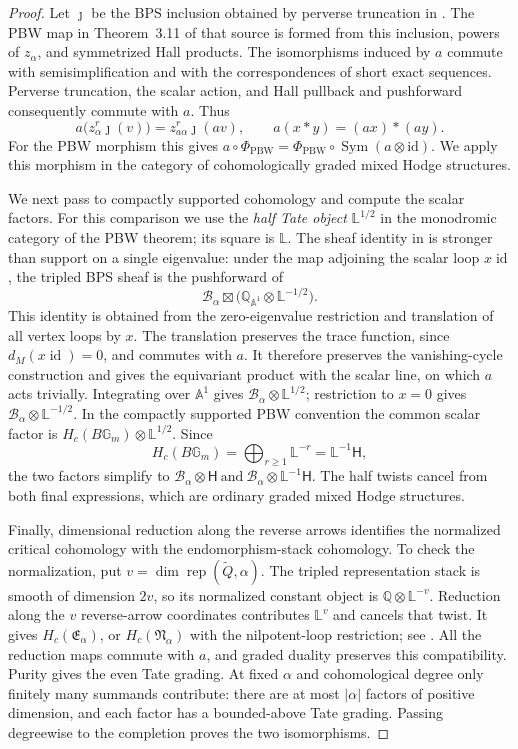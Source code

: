 \documentclass[11pt, reqno]{amsart}
\numberwithin{equation}{section}
\theoremstyle{definition}
\theoremstyle{remark}
\newcommand{\op}[1]{\operatorname{#1}}
\newcommand{\mr}[1]{\mathrm{#1}}
\newcommand{\mb}[1]{\mathbb{#1}}
\newcommand{\mc}[1]{\mathcal{#1}}
\newcommand{\ms}[1]{\mathscr{#1}}
\newcommand{\Rep}{\op{rep}}
\newcommand{\Qbar}{\widetilde Q}
\begin{document}
\begin{proof}
Let $\jmath$ be the BPS inclusion obtained by perverse truncation in
\cite[equation~(24)]{DavisonStacks}. The PBW map in Theorem~3.11 of that source is formed
from this inclusion, powers of $z_\alpha$, and symmetrized Hall
products. The isomorphisms induced by $a$ commute with
semisimplification and with the correspondences of short exact
sequences. Perverse truncation, the scalar action, and Hall pullback
and pushforward consequently commute with $a$. Thus
\[ a\bigl(z_\alpha^r\jmath(v)\bigr) =z_{a\alpha}^r\jmath(av),\qquad a(x*y)=(ax)*(ay). \]
For the PBW morphism this gives
$a\circ\Phi_{\mr{PBW}}=\Phi_{\mr{PBW}}\circ\op{Sym}(a\otimes\mr{id})$.
We apply this morphism in the category of cohomologically graded
mixed Hodge structures.

We next pass to compactly supported cohomology and compute the scalar
factors. For this comparison we use the \emph{half Tate object}
$\mb L^{1/2}$ in the monodromic category of the PBW theorem; its
square is $\mb L$. The sheaf identity in
\cite[Theorem~B and equation~(75)]{DavisonStacks} is stronger than
support on a single eigenvalue: under the map adjoining the scalar
loop $x\op{id}$, the tripled BPS sheaf is the pushforward
of
\[ \ms B_\alpha\boxtimes \bigl(\mb Q_{\mb A^1}\otimes\mb L^{-1/2}\bigr). \]
This identity is obtained from the zero-eigenvalue restriction and
translation of all vertex loops by $x$. The translation preserves the
trace function, since $d_M(x\op{id})=0$, and commutes with
$a$. It therefore preserves the vanishing-cycle construction and gives
the equivariant product with the scalar line, on which $a$ acts
trivially. Integrating
over $\mb A^1$ gives $\mc B_\alpha\otimes\mb L^{1/2}$;
restriction to $x=0$ gives
$\mc B_\alpha\otimes\mb L^{-1/2}$.
In the compactly supported PBW convention the common scalar factor is
$H_c(B\mb G_m)\otimes\mb L^{1/2}$. Since
\[ H_c(B\mb G_m)=\bigoplus_{r\ge1}\mb L^{-r} =\mb L^{-1}\mathsf H, \]
the two factors simplify to
$\mc B_\alpha\otimes\mathsf H \ \text{and}\ \mc B_\alpha\otimes\mb L^{-1}\mathsf H$.
The half twists cancel from both final expressions, which are
ordinary graded mixed Hodge structures.

Finally, dimensional reduction along the reverse arrows identifies
the normalized critical cohomology with the endomorphism-stack
cohomology. To check the normalization, put
$v=\dim\Rep(\Qbar,\alpha)$. The tripled
representation stack is smooth of dimension $2v$, so its normalized
constant object is $\mb Q\otimes\mb L^{-v}$. Reduction along the
$v$ reverse-arrow coordinates contributes $\mb L^v$ and cancels
that twist. It gives $H_c(\mathfrak E_\alpha)$, or
$H_c(\mathfrak N_\alpha)$ with the nilpotent-loop restriction; see
\cite[Theorem~3.7 and equations~(33)--(38)]{DavisonStacks}.
All the reduction maps commute with $a$, and graded duality preserves
this compatibility. Purity gives the even Tate grading. At fixed
$\alpha$ and cohomological degree only finitely many summands
contribute: there are at most $|\alpha|$ factors of positive dimension,
and each factor has a bounded-above Tate grading. Passing degreewise to the completion proves
the two isomorphisms.
\end{proof}
\end{document}
